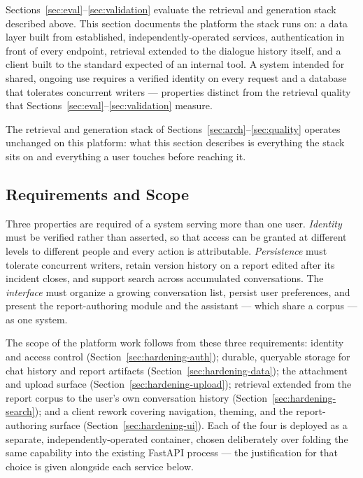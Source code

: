 \documentclass[12pt, a4paper]{article}
\begin{document}
Sections~\ref{sec:eval}--\ref{sec:validation} evaluate the retrieval and generation stack described above. This section documents the platform the stack runs on: a data layer built from established, independently-operated services, authentication in front of every endpoint, retrieval extended to the dialogue history itself, and a client built to the standard expected of an internal tool. A system intended for shared, ongoing use requires a verified identity on every request and a database that tolerates concurrent writers --- properties distinct from the retrieval quality that Sections~\ref{sec:eval}--\ref{sec:validation} measure.

The retrieval and generation stack of Sections~\ref{sec:arch}--\ref{sec:quality} operates unchanged on this platform: what this section describes is everything the stack sits on and everything a user touches before reaching it.

\subsection{Requirements and Scope}

Three properties are required of a system serving more than one user. \emph{Identity} must be verified rather than asserted, so that access can be granted at different levels to different people and every action is attributable. \emph{Persistence} must tolerate concurrent writers, retain version history on a report edited after its incident closes, and support search across accumulated conversations. The \emph{interface} must organize a growing conversation list, persist user preferences, and present the report-authoring module and the assistant --- which share a corpus --- as one system.

The scope of the platform work follows from these three requirements: identity and access control (Section~\ref{sec:hardening-auth}); durable, queryable storage for chat history and report artifacts (Section~\ref{sec:hardening-data}); the attachment and upload surface (Section~\ref{sec:hardening-upload}); retrieval extended from the report corpus to the user's own conversation history (Section~\ref{sec:hardening-search}); and a client rework covering navigation, theming, and the report-authoring surface (Section~\ref{sec:hardening-ui}). Each of the four is deployed as a separate, independently-operated container, chosen deliberately over folding the same capability into the existing FastAPI process --- the justification for that choice is given alongside each service below.
\end{document}
